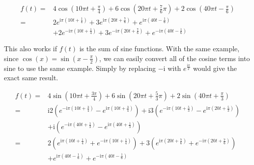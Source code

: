 \documentclass[12pt]{article}
\begin{document}
$$\begin{aligned}
    f(t) 
    =& 4\cos(10\pi t+\frac{\pi}{4}) + 6\cos(20\pi t+\frac{7}{6}\pi) + 2\cos(40\pi t-\frac{\pi}{6})  \\
    =& 2e^{\mathrm{i}\pi(10t+\frac{1}{4})} + 3e^{\mathrm{i}\pi(20t+\frac{7}{6})} + e^{\mathrm{i}\pi(40t-\frac{1}{6})} \\
    &+ 2e^{-\mathrm{i}\pi(10t+\frac{1}{4})} + 3e^{-\mathrm{i}\pi(20t+\frac{7}{6})} + e^{-\mathrm{i}\pi(40t-\frac{1}{6})}
\end{aligned}$$


\indent This also works if $f(t)$ is the sum of sine functions. With the same example, 
since $\cos(x)=\sin(x-\frac{\pi}{2})$, 
we can easily convert all of the cosine terms into sine to use the same example. 
Simply by replacing $-\mathrm{i}$ with 
$e^{\frac{\mathrm{i}\pi}{2}}$ would give the exact same result.

$$\begin{aligned}
    f(t) 
    =& 4\sin(10\pi t+\frac{3\pi}{4}) + 6\sin(20\pi t+\frac{5}{3}\pi) + 2\sin(40\pi t+\frac{\pi}{3}) \\
    =& \mathrm{i}2(e^{-\mathrm{i}\pi(10t+\frac{3}{4})} - e^{\mathrm{i}\pi(10t+\frac{3}{4})}) +
    \mathrm{i}3(e^{-\mathrm{i}\pi(10t+\frac{5}{3})} - e^{\mathrm{i}\pi(20t+\frac{5}{3})})       \\
    &+\mathrm{i}(e^{-\mathrm{i}\pi(40t+\frac{1}{3})} - e^{\mathrm{i}\pi(40t+\frac{1}{3})})       \\
    =& 2(e^{\mathrm{i}\pi(10t+\frac{1}{4})} + e^{-\mathrm{i}\pi(10t+\frac{1}{4})} )
    + 3(e^{\mathrm{i}\pi(20t+\frac{7}{6})} + e^{-\mathrm{i}\pi(20t+\frac{7}{6})})               \\
    &+ e^{\mathrm{i}\pi(40t-\frac{1}{6})} + e^{-\mathrm{i}\pi(40t-\frac{1}{6})}
\end{aligned}$$
\end{document}
